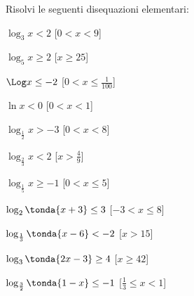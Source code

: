 \begin{esercizio}\label{ese:}
 Risolvi le seguenti disequazioni elementari:
 \begin{multicols}{2}
 \begin{enumeratea}
   \item \(\log_3 x < 2\)
   \hfill [\( 0<x<9\)]
   \item \(\log_5 x \geq 2\)
   \hfill [\(x\geq 25\)]
   \item \(\Log x \leq -2\)
   \hfill [\( 0<x\leq \frac{1}{100}\)]
   \item \(\ln x < 0\)
   \hfill [\( 0 < x <1\)]
   \item \(\log_{\frac{1}{2}} x > -3\)
   \hfill [\(0<x<8\)]
   \item \(\log_{\frac{2}{3}} x < 2\)
   \hfill [\( x>\frac{4}{9}\)]
   \item \(\log_{\frac{1}{5}} x \geq -1\)
   \hfill [\(0<x\leq 5\)]
   \item \(\log_2 \tonda{x+3} \leq 3\)
   \hfill [\(-3<x\leq 8\)]
   \item \(\log_{\frac{1}{3}} \tonda{x-6} < -2\)
   \hfill [\(x>15\)]
   \item \(\log_3 \tonda{2x-3}\geq 4\)
   \hfill [\(x \geq 42\)]
   \item \(\log_{\frac{3}{2}} \tonda{1-x} \leq -1\)
   \hfill [\(\frac{1}{3}\leq x <1\)]
  
 \end{enumeratea}
 \end{multicols}
\end{esercizio}




